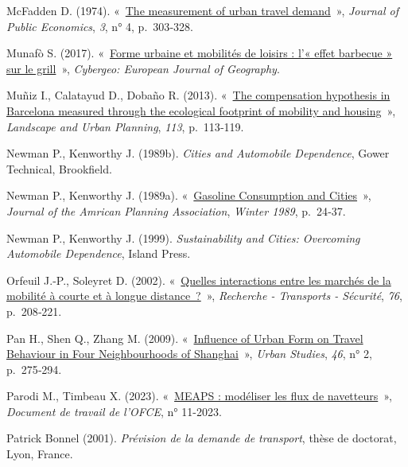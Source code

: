 \documentclass[
  9pt,
  a4paper,
  DIV=11]{scrreprt}
\newlength{\cslhangindent}
\newenvironment{CSLReferences}[2] %
 {\begin{list}{}{%
  \setlength{\itemindent}{0pt}
  \setlength{\leftmargin}{0pt}
  \setlength{\parsep}{0pt}
  \ifodd #1
   \setlength{\leftmargin}{\cslhangindent}
   \setlength{\itemindent}{-1\cslhangindent}
  \fi
  \setlength{\itemsep}{#2\baselineskip}}}
 {\end{list}}
\begin{document}
\begin{CSLReferences}{0}{1}
McFadden D. (1974).
{«~\href{https://doi.org/10.1016/0047-2727(74)90003-6}{The measurement
of urban travel demand}~»}, \emph{Journal of Public Economics},
\emph{3}, n° 4, p.~303‑328.

Munafò S. (2017). {«~\href{https://doi.org/10.4000/cybergeo.28634}{Forme
urbaine et mobilités de loisirs : l{'}« effet barbecue » sur le
grill}~»}, \emph{Cybergeo: European Journal of Geography}.

Muñiz I., Calatayud D., Dobaño R. (2013).
{«~\href{https://doi.org/10.1016/j.landurbplan.2013.02.004}{The
compensation hypothesis in Barcelona measured through the ecological
footprint of mobility and housing}~»}, \emph{Landscape and Urban
Planning}, \emph{113}, p.~113‑119.

Newman P., Kenworthy J. (1989b). \emph{Cities and Automobile
Dependence}, Gower Technical, Brookfield.

Newman P., Kenworthy J. (1989a).
{«~\href{https://doi.org/10.1080/01944368908975398}{Gasoline Consumption
and Cities}~»}, \emph{Journal of the Amrican Planning Association},
\emph{Winter 1989}, p.~24‑37.

Newman P., Kenworthy J. (1999). \emph{Sustainability and Cities:
Overcoming Automobile Dependence}, Island Press.

Orfeuil J.-P., Soleyret D. (2002).
{«~\href{https://doi.org/10.1016/S0761-8980(02)00013-4}{Quelles
interactions entre les marchés de la mobilité à courte et à longue
distance~?}~»}, \emph{Recherche - Transports - Sécurité}, \emph{76},
p.~208‑221.

Pan H., Shen Q., Zhang M. (2009).
{«~\href{https://doi.org/10.1177/0042098008099355}{Influence of Urban
Form on Travel Behaviour in Four Neighbourhoods of Shanghai}~»},
\emph{Urban Studies}, \emph{46}, n° 2, p.~275‑294.

Parodi M., Timbeau X. (2023). {«~\href{https://preview.meaps.fr}{MEAPS :
modéliser les flux de navetteurs}~»}, \emph{Document de travail de
l'OFCE}, n° 11-2023.

Patrick Bonnel (2001). \emph{Prévision de la demande de transport},
thèse de doctorat, Lyon, France.


\end{CSLReferences}
\end{document}

